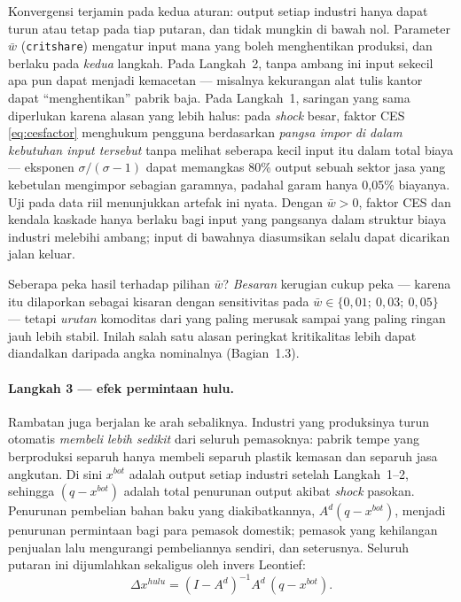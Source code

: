 \documentclass[11pt,a4paper]{article}
\newcommand{\en}[1]{\textit{#1}}   %
\begin{document}
Konvergensi terjamin pada kedua aturan: output setiap industri hanya
dapat turun atau tetap pada tiap putaran, dan tidak mungkin di bawah
nol.
Parameter $\bar w$ (\texttt{critshare}) mengatur input mana yang boleh
menghentikan produksi, dan berlaku pada \emph{kedua} langkah. Pada
Langkah~2, tanpa ambang ini input sekecil apa pun dapat menjadi kemacetan
--- misalnya kekurangan alat tulis kantor dapat ``menghentikan'' pabrik
baja. Pada Langkah~1, saringan yang sama diperlukan karena alasan yang
lebih halus: pada \en{shock} besar, faktor CES \eqref{eq:cesfactor}
menghukum pengguna berdasarkan \emph{pangsa impor di dalam kebutuhan
input tersebut} tanpa melihat seberapa kecil input itu dalam total biaya
--- eksponen $\sigma/(\sigma-1)$ dapat memangkas 80\% output sebuah
sektor jasa yang kebetulan mengimpor sebagian garamnya, padahal garam
hanya 0{,}05\% biayanya. Uji pada data riil menunjukkan artefak ini nyata.
Dengan $\bar w > 0$, faktor CES dan kendala kaskade hanya berlaku bagi
input yang pangsanya dalam struktur biaya industri melebihi ambang;
input di bawahnya diasumsikan selalu dapat dicarikan jalan keluar.

Seberapa peka hasil terhadap pilihan $\bar w$? \emph{Besaran} kerugian
cukup peka --- karena itu dilaporkan sebagai kisaran dengan sensitivitas
pada $\bar w \in \{0{,}01;\ 0{,}03;\ 0{,}05\}$ --- tetapi \emph{urutan}
komoditas dari yang paling merusak sampai yang paling ringan jauh lebih
stabil. Inilah salah satu alasan peringkat kritikalitas lebih dapat
diandalkan daripada angka nominalnya (Bagian~1.3).

\paragraph{Langkah 3 --- efek permintaan hulu.} Rambatan juga berjalan ke
arah sebaliknya. Industri yang produksinya turun otomatis \emph{membeli
lebih sedikit} dari seluruh pemasoknya: pabrik tempe yang berproduksi
separuh hanya membeli separuh plastik kemasan dan separuh jasa angkutan.
Di sini $x^{bot}$ adalah output setiap industri setelah Langkah~1--2,
sehingga $(q - x^{bot})$ adalah total penurunan output akibat \en{shock}
pasokan. Penurunan pembelian bahan baku yang diakibatkannya,
$A^d (q - x^{bot})$, menjadi penurunan permintaan bagi para pemasok
domestik; pemasok yang kehilangan penjualan lalu mengurangi pembeliannya
sendiri, dan seterusnya. Seluruh putaran ini dijumlahkan sekaligus oleh
invers Leontief:
\begin{equation}
\Delta x^{hulu} = (I - A^d)^{-1} A^d \, (q - x^{bot}).
\end{equation}
\end{document}
